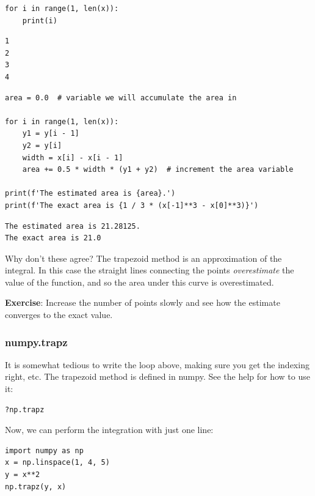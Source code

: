 \documentclass[11pt]{article}
\begin{document}
\begin{verbatim}
for i in range(1, len(x)):
    print(i)
\end{verbatim}

\begin{verbatim}
1
2
3
4

\end{verbatim}


\begin{verbatim}
area = 0.0  # variable we will accumulate the area in

for i in range(1, len(x)):
    y1 = y[i - 1]
    y2 = y[i]
    width = x[i] - x[i - 1]
    area += 0.5 * width * (y1 + y2)  # increment the area variable

print(f'The estimated area is {area}.')
print(f'The exact area is {1 / 3 * (x[-1]**3 - x[0]**3)}')
\end{verbatim}

\begin{verbatim}
The estimated area is 21.28125.
The exact area is 21.0

\end{verbatim}

Why don't these agree? The trapezoid method is an approximation of the integral. In this case the straight lines connecting the points \emph{overestimate} the value of the function, and so the area under this curve is overestimated.

\textbf{Exercise}: Increase the number of points slowly and see how the estimate converges to the exact value.

\subsubsection{numpy.trapz}
\label{sec:orgc590164}

It is somewhat tedious to write the loop above, making sure you get the indexing right, etc. The trapezoid method is defined in numpy. See the help for how to use it:

\begin{verbatim}
?np.trapz
\end{verbatim}

Now, we can perform the integration with just one line:

\begin{verbatim}
import numpy as np
x = np.linspace(1, 4, 5)
y = x**2
np.trapz(y, x)
\end{verbatim}
\end{document}

